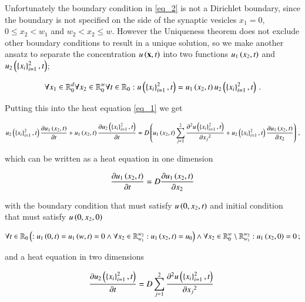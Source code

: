 \documentclass[11pt,english,a4paper]{article}
\begin{document}
\begin{flushleft}
Unfortunately the boundary condition in \eqref{eq_2} is not a Dirichlet boundary, since the boundary is not specified on the side of the synaptic vesicles $x_1=0$, $0\leq x_2 < w_1$ and $w_2 < x_2 \leq w$. However the Uniqueness theorem does not exclude other boundary conditions to result in a unique solution, so we make another ansatz to separate the concentration $u\left({\textbf{x},t}\right)$ into two functions $u_1\left({x_2,t}\right)$ and $u_2\left({\left\lbrace{x_i}\right\rbrace_{i=1}^2,t}\right)$;

\begin{align}
\forall x_1 \in \mathbb{R}_0^d \forall x_2 \in \mathbb{R}_0^w \forall t \in \mathbb{R}_{0}: u\left({\left\lbrace{x_i}\right\rbrace_{i=1}^2,t}\right) = u_1\left({x_2,t}\right) u_2\left({\left\lbrace{x_i}\right\rbrace_{i=1}^2,t}\right) \,.
\label{eq_3}
\end{align}

Putting this into the heat equation \eqref{eq_1} we get

\begin{align*}
u_2\left({\left\lbrace{x_i}\right\rbrace_{i=1}^2,t}\right)\frac{\partial u_1\left({x_2,t}\right)}{\partial t} + u_1\left({x_2,t}\right)\frac{\partial u_2\left({\left\lbrace{x_i}\right\rbrace_{i=1}^2,t}\right)}{\partial t} = D\left({u_1\left({x_2,t}\right)\sum_{j=1}^2\frac{\partial^2 u\left({\left\lbrace{x_i}\right\rbrace_{i=1}^2,t}\right)}{\partial {x_j}^2} + u_2\left({\left\lbrace{x_i}\right\rbrace_{i=1}^2,t}\right)\frac{\partial u_1\left({x_2,t}\right)}{\partial x_2}}\right) \,,
\end{align*}

which can be written as a heat equation in one dimension

\begin{align}
\frac{\partial u_1\left({x_2,t}\right)}{\partial t}  = D \frac{\partial u_1\left({x_2,t}\right)}{\partial x_2}
\label{eq_4}
\end{align}

with the boundary condition that must satisfy $u\left({0,x_2,t}\right)$ and initial condition that must satisfy $u\left({0,x_2,0}\right)$

\begin{align}
\forall t \in \mathbb{R}_0 \left({: u_1\left({0,t}\right) = u_1\left({w,t}\right) = 0 \wedge \forall x_2\in\mathbb{R}_{w_1}^{w_2}: u_1\left({x_2,t}\right) = u_0}\right) \wedge \forall x_2 \in\mathbb{R}_{0}^{w} \setminus \mathbb{R}_{w_1}^{w_2}: u_1\left({x_2,0}\right) = 0\,;
\label{eq_5}
\end{align}

and a heat equation in two dimensions

\begin{align}
\frac{\partial u_2\left({\left\lbrace{x_i}\right\rbrace_{i=1}^2,t}\right)}{\partial t} = D\sum_{j=1}^2\frac{\partial^2 u\left({\left\lbrace{x_i}\right\rbrace_{i=1}^2,t}\right)}{\partial {x_j}^2} \
\label{eq_6}
\end{align}


\end{flushleft}
\end{document}
